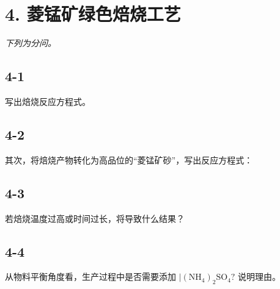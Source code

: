\section*{4. 菱锰矿绿色焙烧工艺}
\textit{下列为分问。}

\subsection*{4-1}
写出焙烧反应⽅程式。

\subsection*{4-2}
其次，将焙烧产物转化为⾼品位的“菱锰矿砂”，写出反应⽅程式：

\subsection*{4-3}
若焙烧温度过⾼或时间过⻓，将导致什么结果？

\subsection*{4-4}
从物料平衡⻆度看，⽣产过程中是否需要添加 $\mathrm { | ( N H _ { 4 } ) _ { 2 } S O _ { 4 } ? }$ 说明理由。
